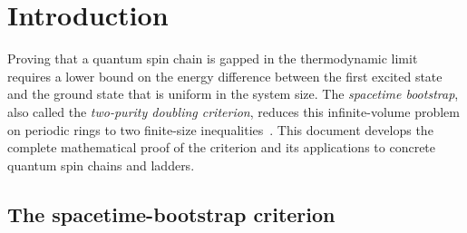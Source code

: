 \chapter{Introduction}
\label{chap:intro}

Proving that a quantum spin chain is gapped in the thermodynamic limit requires a lower bound on
the energy difference between the first excited state and the ground state that is uniform in the
system size. The \emph{spacetime bootstrap}, also called the \emph{two-purity doubling criterion},
reduces this infinite-volume problem on periodic rings to two finite-size
inequalities~\cite{OpenAIHaldane}.
This document develops the complete mathematical proof of the criterion and its applications to
concrete quantum spin chains and ladders.

\section{The spacetime-bootstrap criterion}

